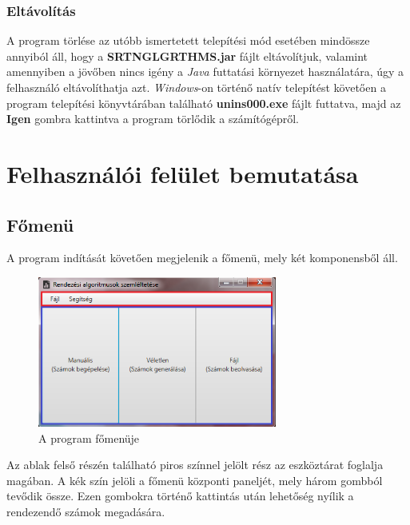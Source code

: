 \documentclass{elteikthesis}
\begin{document}
\subsubsection{Eltávolítás}
A program törlése az utóbb ismertetett telepítési mód esetében mindössze annyiból áll, hogy a \textbf{SRTNGLGRTHMS.jar} fájlt eltávolítjuk, valamint amennyiben a jövőben nincs igény a \emph{Java} futtatási környezet használatára, úgy a felhasználó eltávolíthatja azt.
\emph{Windows}-on történő natív telepítést követően a program telepítési könyvtárában található \textbf{unins000.exe} fájlt futtatva, majd az \textbf{Igen} gombra kattintva a program törlődik a számítógépről.

\section{Felhasználói felület bemutatása}
\subsection{Főmenü}
A program indítását követően megjelenik a főmenü, mely két komponensből áll.\par
\begin{figure}[H]
	\centering
	\includegraphics[width=0.7\textwidth]{pics/mainmenu.png}
	\caption{A program főmenüje}
\end{figure}\par
  Az ablak felső részén található piros színnel jelölt rész az eszköztárat foglalja magában. A kék szín jelöli a főmenü központi paneljét, mely három gombból tevődik össze. Ezen gombokra történő kattintás után lehetőség nyílik a rendezendő számok megadására.
\end{document}
